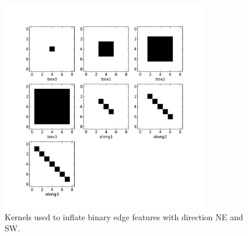 \documentclass{report}
\begin{document}
\begin{figure}
    \centering
    \includegraphics[width=0.8\textwidth]{figs/kernels.pdf}
    \caption{Kernels used to inflate binary edge features with direction NE and SW.} \label{fig:kernels}
\end{figure}
\end{document}
